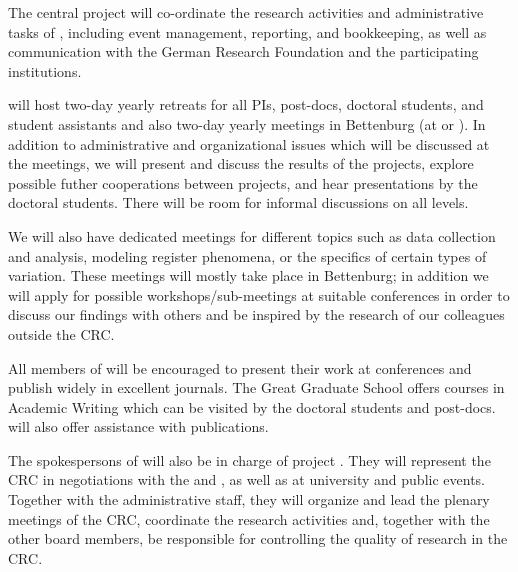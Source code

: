 
\notocsubsection{\pipl}
\begin{giprenv}
  
\end{giprenv}
\gicolsep
\begin{giprenv}
  
\end{giprenv}

\notocsubsection{\prsum}

The central project will co-ordinate the research activities and
administrative tasks of \thiscrc, including event management,
reporting, and bookkeeping, as well as communication with the German
Research Foundation and the participating institutions.

\thiscrc{} will host two-day yearly retreats for all PIs, post-docs,
doctoral students, and student assistants and also two-day yearly
meetings in Bettenburg (at \ABRA{} or \ABRB{}). In addition to
administrative and organizational issues which will be discussed at
the meetings, we will present and discuss the results of the projects,
explore possible futher cooperations between projects, and hear
presentations by the doctoral students. There will be room for
informal discussions on all levels.

We will also have dedicated meetings for different topics such as data
collection and analysis, modeling register phenomena, or the specifics
of certain types of variation. These meetings will mostly take place
in Bettenburg; in addition we will apply for possible
workshops/sub-meetings at suitable conferences in order to discuss our
findings with others and be inspired by the research of our colleagues
outside the CRC.

All members of \thiscrc{} will be encouraged to present their work at
conferences and publish widely in excellent journals. The Great
Graduate School offers courses in Academic Writing which can be
visited by the doctoral students and post-docs.  will also
offer assistance with publications.

The spokespersons of \thiscrc{} will also be in charge of project
.  They will represent the CRC in negotiations with the
\ABRA{} and \ABRB, as well as at university and
public events. Together with the administrative staff, they will
organize and lead the plenary meetings of the CRC, coordinate the
research activities and, together with the other board members, be
responsible for controlling the quality of research in the CRC.

